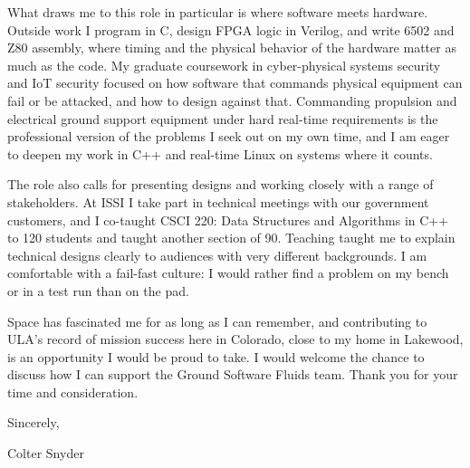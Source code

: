 \documentclass[letterpaper,11pt]{article}
\begin{document}
What draws me to this role in particular is where software meets hardware. Outside work I program
in C, design FPGA logic in Verilog, and write 6502 and Z80 assembly, where timing and the physical behavior of the
hardware matter as much as the code. My graduate coursework in cyber-physical systems security and
IoT security focused on how software that commands physical equipment can fail or be attacked, and
how to design against that. Commanding propulsion and electrical ground support equipment under hard
real-time requirements is the professional version of the problems I seek out on my own time, and I
am eager to deepen my work in C++ and real-time Linux on systems where it counts.

The role also calls for presenting designs and working closely with a range of stakeholders. At ISSI
I take part in technical meetings with our government customers, and I co-taught CSCI 220: Data
Structures and Algorithms in C++ to 120 students and taught another section of 90. Teaching taught me
to explain technical designs clearly to audiences with very different backgrounds. I am comfortable with a fail-fast culture: I would rather find a problem on
my bench or in a test run than on the pad.

Space has fascinated me for as long as I can remember, and contributing to ULA's record of mission
success here in Colorado, close to my home in Lakewood, is an opportunity I would be proud to take.
I would welcome the chance to discuss how I can support the Ground Software Fluids team. Thank you
for your time and consideration.

Sincerely,

Colter Snyder
\end{document}
